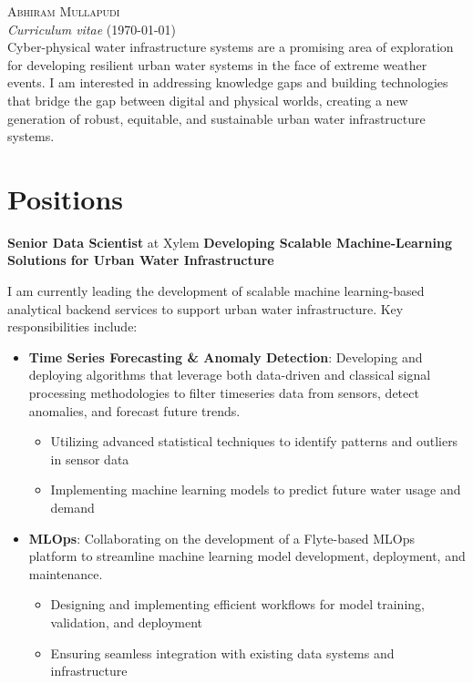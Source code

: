 \documentclass[a4paper,11pt]{article}
\newcommand{\years}[1]{%
  {\reversemarginpar\strut\marginnote{{\small#1}}}%
}
\begin{document}
{\huge \textsc{Abhiram Mullapudi}}\\
{\small \textit{Curriculum vitae} (\today)}\\

Cyber-physical water infrastructure systems are a promising area of exploration for developing resilient urban water systems in the face of extreme weather
events. I am interested in addressing knowledge gaps and building technologies that bridge the gap between digital and physical worlds, creating a new
generation of robust, equitable, and sustainable urban water infrastructure systems.

{\scriptsize
\faEnvelope{}
\faHome{}
\faGithub{}
\faLeanpub{}}


\section*{Positions}

\years{2023--}
\textbf{Senior Data Scientist} at Xylem
\textbf{Developing Scalable Machine-Learning Solutions for Urban Water Infrastructure}

I am currently leading the development of scalable machine learning-based analytical backend services to support urban water infrastructure. Key
responsibilities include:
\begin{itemize}
    \item
    \textbf{Time Series Forecasting \& Anomaly Detection}:
    Developing and deploying algorithms that leverage both data-driven and classical signal processing methodologies to filter timeseries data from sensors,
detect anomalies, and forecast future trends.
        \begin{itemize}
            \item Utilizing advanced statistical techniques to identify patterns and outliers in sensor data
            \item Implementing machine learning models to predict future water usage and demand
        \end{itemize}
    \item
    \textbf{MLOps}:
    Collaborating on the development of a Flyte-based MLOps platform to streamline machine learning model development, deployment, and maintenance.
        \begin{itemize}
            \item Designing and implementing efficient workflows for model training, validation, and deployment
            \item Ensuring seamless integration with existing data systems and infrastructure
        \end{itemize}
\end{itemize}
\end{document}

